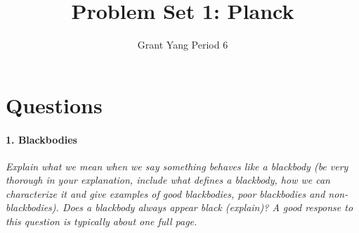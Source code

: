 \documentclass[12pt]{article}
\begin{document}
 
%
%
 
\title{Problem Set 1: Planck} %
\author{Grant Yang Period 6} %
\maketitle



\section{Questions}

\paragraph{1. Blackbodies} \emph{Explain what we mean when we say something behaves like a blackbody (be very thorough in your explanation, include what defines a blackbody, how we can characterize it and give examples of good blackbodies, poor blackbodies and non-blackbodies). Does a blackbody always appear black (explain)? A good response to this question is typically about one full page.} \medskip
\end{document}
